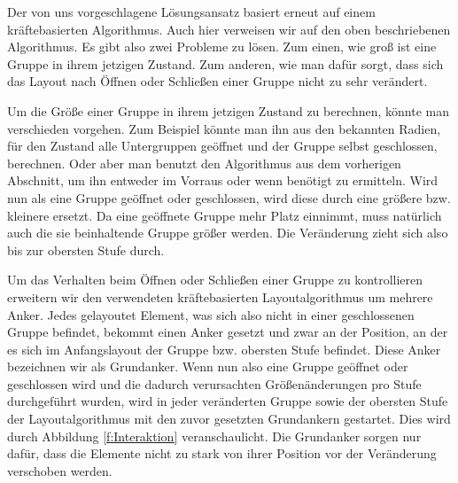 Der von uns vorgeschlagene Lösungsansatz basiert erneut auf einem kräftebasierten Algorithmus. 
Auch hier verweisen wir auf den oben beschriebenen Algorithmus. Es gibt also zwei Probleme zu lösen. 
Zum einen, wie groß ist eine Gruppe in ihrem jetzigen Zustand.  
Zum anderen, wie man dafür sorgt, dass sich das Layout nach Öffnen oder Schließen einer Gruppe nicht zu sehr verändert.

Um die Größe einer Gruppe in ihrem jetzigen Zustand zu berechnen, könnte man verschieden vorgehen. 
Zum Beispiel könnte man ihn aus den bekannten Radien, für den Zustand alle Untergruppen geöffnet und der Gruppe selbst geschlossen, berechnen. 
Oder aber man benutzt den Algorithmus aus dem vorherigen Abschnitt, um ihn entweder im Vorraus oder wenn benötigt zu ermitteln. 
Wird nun als eine Gruppe geöffnet oder geschlossen, wird diese durch eine größere bzw. kleinere ersetzt. 
Da eine geöffnete Gruppe mehr Platz einnimmt, muss natürlich auch die sie beinhaltende Gruppe größer werden. 
Die Veränderung zieht sich also bis zur obersten Stufe durch.


Um das Verhalten beim Öffnen oder Schließen einer Gruppe zu kontrollieren erweitern wir den verwendeten kräftebasierten Layoutalgorithmus um mehrere Anker. 
Jedes gelayoutet Element, was sich also nicht in einer geschlossenen Gruppe befindet, bekommt einen Anker gesetzt und zwar an der Position, 
an der es sich im Anfangslayout der Gruppe bzw. obersten Stufe befindet. 
Diese Anker bezeichnen wir als Grundanker. 
Wenn nun also eine Gruppe geöffnet oder geschlossen wird und die dadurch verursachten Größenänderungen pro Stufe durchgeführt wurden, 
wird in jeder veränderten Gruppe sowie der obersten Stufe der Layoutalgorithmus mit den zuvor gesetzten Grundankern gestartet. 
Dies wird  durch Abbildung \ref{f:Interaktion} veranschaulicht. Die Grundanker sorgen nur dafür, dass die Elemente nicht zu stark von ihrer Position vor der Veränderung verschoben werden.


